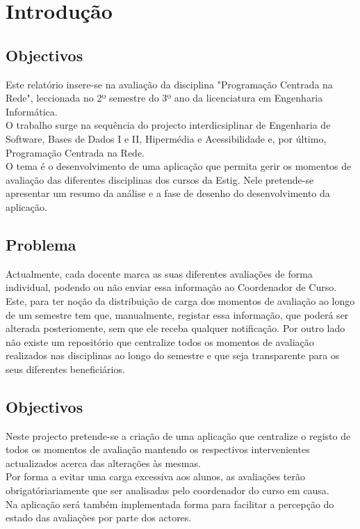 

\chapter{Introdução}

\paragraph{}

\section{Objectivos}
Este relatório insere-se na avaliação da disciplina "Programação Centrada na Rede", leccionada no 2º semestre do 3º ano da licenciatura em Engenharia Informática.\\ 
O trabalho surge na sequência do projecto interdicsiplinar de Engenharia de Software, Bases de Dados I e II, Hipermédia e Acessibilidade e, por último, Programação Centrada na Rede.\\
O tema é o desenvolvimento de uma aplicação que permita gerir os momentos de avaliação das diferentes disciplinas dos cursos da Estig.
Nele pretende-se apresentar um resumo da análise e a fase de desenho do desenvolvimento da aplicação.\\

\section{Problema}
Actualmente, cada docente marca as suas diferentes avaliações de forma individual, podendo ou não enviar essa informação ao Coordenador de Curso. Este, para ter noção da distribuição de carga dos momentos de avaliação ao longo de um semestre tem que, manualmente, registar essa informação, que poderá ser alterada posteriomente, sem que ele receba qualquer notificação. Por outro lado não existe um repositório que centralize todos os momentos de avaliação realizados nas disciplinas ao longo do semestre e que seja transparente para os seus diferentes beneficiários.

\section{Objectivos}
Neste projecto pretende-se a criação de uma aplicação que centralize o registo de todos os momentos de avaliação mantendo os respectivos intervenientes actualizados acerca das alterações às mesmas.\\
Por forma a evitar uma carga excessiva aos alunos, as avaliações terão obrigatóriariamente que ser analisadas pelo coordenador do curso em causa.\\
Na aplicação será também implementada forma para facilitar a percepção do estado das avaliações por parte dos actores.\\


